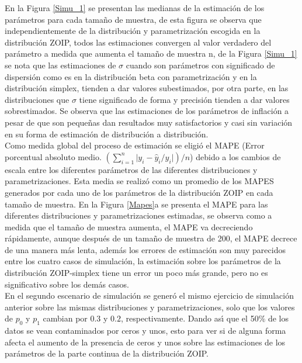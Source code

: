 En la Figura \ref{Simu_1} se presentan las medianas de la estimaci\'{o}n de los par\'{a}metros para cada tama\~{n}o de muestra, de esta figura se observa que independientemente de la distribuci\'{o}n y pa\-ra\-me\-tri\-za\-ci\-\'{o}n escogida en la distribuci\'{o}n ZOIP, todos las estimaciones convergen al valor verdadero del par\'{a}metro a medida que aumenta el tama\~{n}o de muestra n, de la Figura \ref{Simu_1} se nota que las estimaciones de $\sigma$ cuando son par\'{a}metros con significado de dispersi\'{o}n como es en la distribuci\'{o}n beta con parametrizaci\'{o}n \cite{Stasinopoulos2} y en la distribuci\'{o}n simplex, tienden a dar valores subestimados, por otra parte, en las distribuciones que $\sigma$ tiene significado de forma y precisi\'{o}n tienden a dar valores sobrestimados. Se observa que las estimaciones de los par\'{a}metros de inflaci\'{o}n a pesar de que son peque\~{n}as dan resultados muy satisfactorios y casi sin variaci\'{o}n en su forma de estimaci\'{o}n de distribuci\'{o}n a distribuci\'{o}n.\\

Como medida global del proceso de estimaci\'{o}n se eligi\'{o} el MAPE (Error porcentual absoluto medio. $(\sum_{i=1}^{n}{|y_i-\hat{y}_i/y_i}|)/n$) debido a los cambios de escala entre los diferentes par\'{a}metros de las diferentes distribuciones y parametrizaciones. Esta media se realiz\'{o} como un promedio de los MAPES generados por cada uno de los par\'{a}metros de la distribuci\'{o}n ZOIP en cada tama\~{n}o de muestra. En la Figura \ref{Mapes}a se presenta el MAPE para las diferentes distribuciones y parametrizaciones estimadas, se observa como a medida que el tama\~{n}o de muestra aumenta, el MAPE va decreciendo r\'{a}pidamente, aunque des\-pu\'{e}s de un tama\~{n}o de muestra de 200, el MAPE decrece de una manera m\'{a}s lenta, adem\'{a}s los errores de estimaci\'{o}n son muy parecidos entre los cuatro casos de simulaci\'{o}n, la estimaci\'{o}n sobre los par\'{a}metros de la distribuci\'{o}n ZOIP-simplex tiene un error un poco m\'{a}s grande, pero no es significativo sobre los dem\'{a}s casos.\\
 
En el segundo escenario de simulaci\'{o}n se gener\'{o} el mismo ejercicio de simulaci\'{o}n anterior sobre las mismas distribuciones y parametrizaciones, solo que los valores de $p_0$ y $p_1$ cambian por $0.3$ y $0.2$, respectivamente. Dando as\'{\i} que el 50\% de los datos se vean contaminados por ceros y unos, esto para ver si de alguna forma afecta el aumento de la presencia de ceros y unos sobre las estimaciones de los par\'{a}metros de la parte continua de la distribuci\'{o}n ZOIP.

